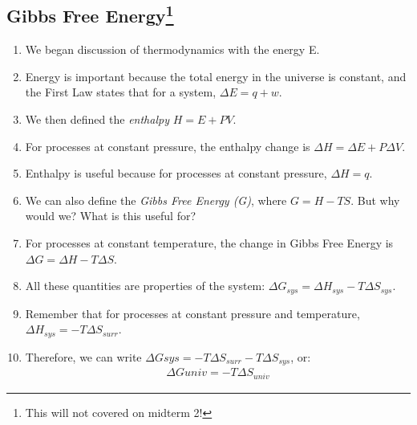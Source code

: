 \documentclass{article}  %
\begin{document}
\subsection*{Gibbs Free Energy\footnote{This will not covered on midterm 2!}}
\begin{enumerate}
    \item We began discussion of thermodynamics with the energy E.
    \item Energy is important because the total energy in the universe is constant, and the First Law states that for a system, $\Delta E = q + w$.
    \item We then defined the \emph{enthalpy} $H = E + PV$.
    \item For processes at constant pressure, the enthalpy change is $\Delta H = \Delta E + P\Delta V$.
    \item Enthalpy is useful because for processes at constant pressure, $\Delta H = q$.
    \item We can also define the \emph{Gibbs Free Energy (G)}, where $G = H - TS$. But why would we? What is this useful for?
    \item For processes at constant temperature, the change in Gibbs Free Energy is $\Delta G = \Delta H - T \Delta S$.
    \item All these quantities are properties of the system: $\Delta G_{sys} = \Delta H_{sys} - T \Delta S_{sys}$. 
    \item Remember that for processes at constant pressure and temperature, $\Delta H_{sys} = -T\Delta S_{surr}$.
    \item Therefore, we can write $\Delta G{sys} = -T\Delta S_{surr} - T\Delta S_{sys}$, or:
        \begin{equation*}
            \begin{aligned}
                \Delta G{univ} = -T\Delta S_{univ}
            \end{aligned}
        \end{equation*} 
\end{enumerate}
 
\end{document}
